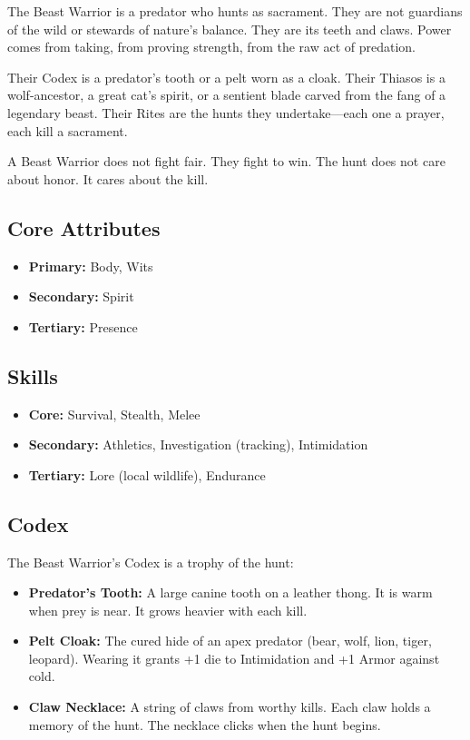 The Beast Warrior is a predator who hunts as sacrament. They are not guardians of the wild or stewards of nature's balance. They are its teeth and claws. Power comes from taking, from proving strength, from the raw act of predation.

Their Codex is a predator's tooth or a pelt worn as a cloak. Their Thiasos is a wolf-ancestor, a great cat's spirit, or a sentient blade carved from the fang of a legendary beast. Their Rites are the hunts they undertake—each one a prayer, each kill a sacrament.

A Beast Warrior does not fight fair. They fight to win. The hunt does not care about honor. It cares about the kill.

\subsection{Core Attributes}

\begin{itemize}
\item \textbf{Primary:} Body, Wits
\item \textbf{Secondary:} Spirit
\item \textbf{Tertiary:} Presence
\end{itemize}

\subsection{Skills}

\begin{itemize}
\item \textbf{Core:} Survival, Stealth, Melee
\item \textbf{Secondary:} Athletics, Investigation (tracking), Intimidation
\item \textbf{Tertiary:} Lore (local wildlife), Endurance
\end{itemize}

\subsection{Codex}

The Beast Warrior's Codex is a trophy of the hunt:

\begin{itemize}
\item \textbf{Predator's Tooth:} A large canine tooth on a leather thong. It is warm when prey is near. It grows heavier with each kill.
\item \textbf{Pelt Cloak:} The cured hide of an apex predator (bear, wolf, lion, tiger, leopard). Wearing it grants +1 die to Intimidation and +1 Armor against cold.
\item \textbf{Claw Necklace:} A string of claws from worthy kills. Each claw holds a memory of the hunt. The necklace clicks when the hunt begins.
\end{itemize}

